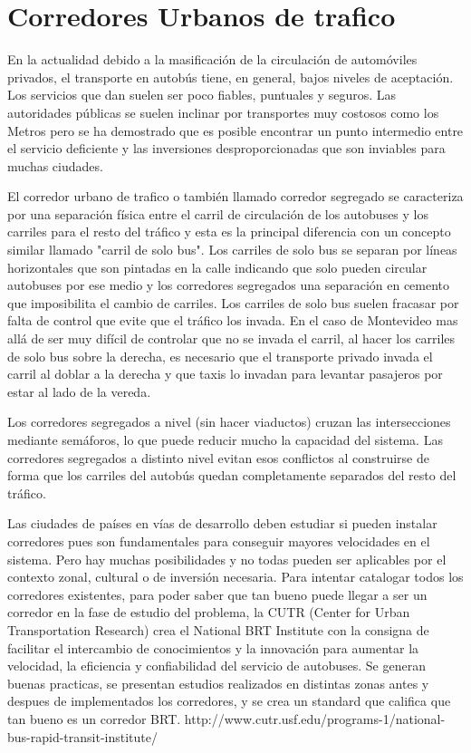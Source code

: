\section{Corredores Urbanos de trafico}

En la actualidad debido a la masificación de la circulación de automóviles privados, el transporte en autobús tiene, en general, bajos niveles de aceptación. Los servicios que dan suelen ser poco fiables, puntuales y seguros. Las autoridades públicas se suelen inclinar por transportes muy costosos como los Metros pero se ha demostrado que es posible encontrar un punto intermedio entre el servicio deficiente y las inversiones desproporcionadas que son inviables para muchas ciudades.

El corredor urbano de trafico o también llamado corredor segregado se caracteriza por una separación física entre el carril de circulación de los autobuses y los carriles para el resto del tráfico y esta es la principal diferencia con un concepto similar llamado "carril de solo bus". Los carriles de solo bus se separan por líneas horizontales que son pintadas en la calle indicando que solo pueden circular autobuses por ese medio y los corredores segregados una separación en cemento que imposibilita el cambio de carriles. Los carriles de solo bus suelen fracasar por falta de control que evite que el tráfico los invada. En el caso de Montevideo mas allá de ser muy difícil de controlar que no se invada el carril, al hacer los carriles de solo bus sobre la derecha, es necesario que el transporte privado invada el carril al doblar a la derecha y que taxis lo invadan para levantar pasajeros por estar al lado de la vereda.  

Los corredores segregados a nivel (sin hacer viaductos) cruzan las intersecciones mediante semáforos, lo que puede reducir mucho la capacidad del sistema. Las corredores segregados a distinto nivel evitan esos conflictos al construirse de forma que los carriles del autobús quedan completamente separados del resto del tráfico. 


Las ciudades de países en vías de desarrollo deben estudiar si pueden instalar corredores pues son fundamentales para conseguir mayores velocidades en el sistema. Pero hay muchas posibilidades y no todas pueden ser aplicables por el contexto zonal, cultural o de inversión necesaria. Para intentar catalogar todos los corredores existentes, para poder saber que tan bueno puede llegar a ser un corredor en la fase de estudio del problema, la CUTR (Center for Urban Transportation Research) crea el National BRT Institute con la consigna de facilitar el intercambio de conocimientos y la innovación para aumentar la velocidad, la eficiencia y confiabilidad del servicio de autobuses. Se generan buenas practicas, se presentan estudios realizados en distintas zonas antes y despues de implementados los corredores, y se crea un standard que califica que tan bueno es un corredor BRT.
http://www.cutr.usf.edu/programs-1/national-bus-rapid-transit-institute/

